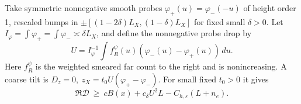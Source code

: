 \begin{lemma}\label{lem:07_magnetic_analysis-coarse}
Take symmetric nonnegative smooth probes \(\varphi_+(u)=\varphi_-(-u)\) of height order 1, rescaled bumps in \(\pm[(1-2\delta)L_X,(1-\delta)L_X]\) for fixed small \(\delta>0\). Let \(I_\varphi=\int\varphi_+=\int\varphi_-\asymp\delta L_X\), and define the nonnegative probe drop by \[ U=I_\varphi^{-1}\int f_R^\psi(u)(\varphi_-(u)-\varphi_+(u))\,du. \] Here \(f_R^\psi\) is the weighted smeared far count to the right and is nonincreasing. A coarse tilt is \(D_z=0,\ z_X=t_0 U(\varphi_+-\varphi_-)\). For small fixed \(t_0>0\) it gives
\begin{equation}
 \Re\mathcal D\ \ge\ c B(x)+c_\delta U^2 L-C_{h,\varepsilon}(L+n_e).
 \label{eq:M-24}
\end{equation}

\end{lemma}
